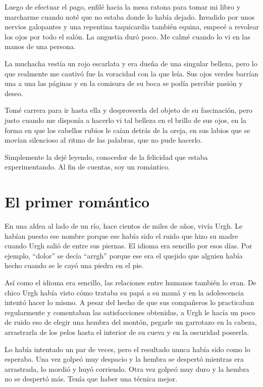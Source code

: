 \documentclass[11pt,twoside,openright,a6paper]{book}
\begin{document}
Luego de efectuar el pago, enfilé hacia la mesa ratona para tomar mi libro y marcharme cuando noté que no estaba donde lo había dejado. Invadido por unos nervios galopantes y una repentina taquicardia también equina, empecé a revolear los ojos por todo el salón. La angustia duró poco. Me calmé cuando lo vi en las manos de una persona.

La muchacha vestía un rojo escarlata y era dueña de una singular belleza, pero lo que realmente me cautivó fue la voracidad con la que leía. Sus ojos verdes barrían una a una las páginas y en la comisura de su boca se podía percibir pasión y deseo.

Tomé carrera para ir hasta ella y desproveerla del objeto de su fascinación, pero justo cuando me disponía a hacerlo vi tal belleza en el brillo de sus ojos, en la forma en que los cabellos rubios le caían detrás de la oreja, en sus labios que se movían silencioso al ritmo de las palabras, que no pude hacerlo.

Simplemente la dejé leyendo, conocedor de la felicidad que estaba experimentando. Al fin de cuentas, soy un romántico.

\chapter*{El primer romántico}

En una aldea al lado de un río, hace cientos de miles de años, vivía Urgh. Le habían puesto ese nombre porque ese había sido el ruido que hizo su madre cuando Urgh salió de entre sus piernas. El idioma era sencillo por esos días. Por ejemplo, “dolor” se decía “arrgh” porque ese era el quejido que alguien había hecho cuando se le cayó una piedra en el pie.

Así como el idioma era sencillo, las relaciones entre humanos también lo eran. De chico Urgh había visto cómo trataba su papá a su mamá y en la adolescencia intentó hacer lo mismo. A pesar del hecho de que sus compañeros lo practicaban regularmente y comentaban las satisfacciones obtenidas, a Urgh le hacía un poco de ruido eso de elegir una hembra del montón, pegarle un garrotazo en la cabeza, arrastrarla de los pelos hasta el interior de su cueva y en la oscuridad poseerla.

Lo había intentado un par de veces, pero el resultado nunca había sido como lo esperaba. Una vez golpeó muy despacio y la hembra se despertó mientras era arrastrada, lo mordió y huyó corriendo. Otra vez golpeó muy duro y la hembra no se despertó más. Tenía que haber una técnica mejor.
\end{document}
